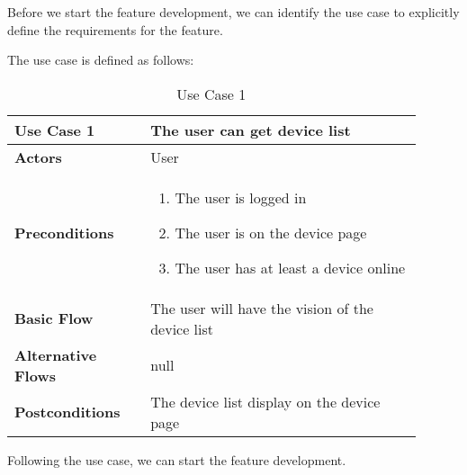 Before we start the feature development, we can identify the use case to 
explicitly define the requirements for the feature. 

The use case is defined as follows:

\begin{table}[htpb]
    \centering
    \begin{tabular}{|p{0.3\linewidth}|p{0.6\linewidth}|}
        \hline
        \textbf{Use Case 1} & 
        \textbf{The user can get device list} \\
        \hline
        \textbf{Actors} & User \\
        \hline
        \textbf{Preconditions} & 
        \begin{enumerate}
            \item The user is logged in
            \item The user is on the device page
            \item The user has at least a device online
        \end{enumerate}\\
        \hline
        \textbf{Basic Flow} & 
            The user will have the vision of the device list \\
        \hline
        \textbf{Alternative Flows} & 
        null \\
        \hline
        \textbf{Postconditions} & The device list display on the device page \\
        \hline
    \end{tabular}
    \caption{Use Case 1}
    \label{tab:useCase1}
\end{table}

Following the use case, we can start the feature development.
